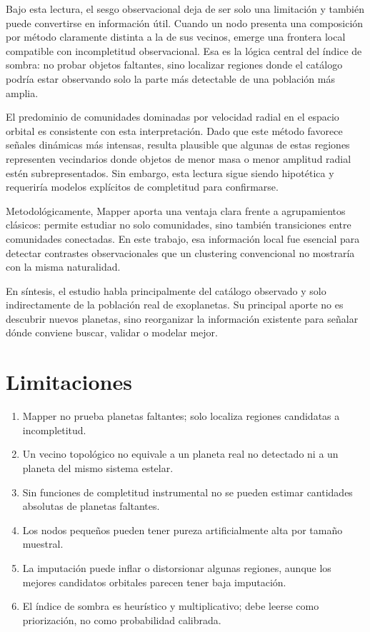 \documentclass[11pt]{article}
\begin{document}
Bajo esta lectura, el sesgo observacional deja de ser solo una limitación y también puede convertirse en información útil. Cuando un nodo presenta una composición por método claramente distinta a la de sus vecinos, emerge una frontera local compatible con incompletitud observacional. Esa es la lógica central del índice de sombra: no probar objetos faltantes, sino localizar regiones donde el catálogo podría estar observando solo la parte más detectable de una población más amplia.

El predominio de comunidades dominadas por velocidad radial en el espacio orbital es consistente con esta interpretación. Dado que este método favorece señales dinámicas más intensas, resulta plausible que algunas de estas regiones representen vecindarios donde objetos de menor masa o menor amplitud radial estén subrepresentados. Sin embargo, esta lectura sigue siendo hipotética y requeriría modelos explícitos de completitud para confirmarse.

Metodológicamente, Mapper aporta una ventaja clara frente a agrupamientos clásicos: permite estudiar no solo comunidades, sino también transiciones entre comunidades conectadas. En este trabajo, esa información local fue esencial para detectar contrastes observacionales que un clustering convencional no mostraría con la misma naturalidad.

En síntesis, el estudio habla principalmente del catálogo observado y solo indirectamente de la población real de exoplanetas. Su principal aporte no es descubrir nuevos planetas, sino reorganizar la información existente para señalar dónde conviene buscar, validar o modelar mejor.

\section{Limitaciones}

\begin{enumerate}
  \item Mapper no prueba planetas faltantes; solo localiza regiones candidatas a incompletitud.
  \item Un vecino topológico no equivale a un planeta real no detectado ni a un planeta del mismo sistema estelar.
  \item Sin funciones de completitud instrumental no se pueden estimar cantidades absolutas de planetas faltantes.
  \item Los nodos pequeños pueden tener pureza artificialmente alta por tamaño muestral.
  \item La imputación puede inflar o distorsionar algunas regiones, aunque los mejores candidatos orbitales parecen tener baja imputación.
  \item El índice de sombra es heurístico y multiplicativo; debe leerse como priorización, no como probabilidad calibrada.
\end{enumerate}
\end{document}
